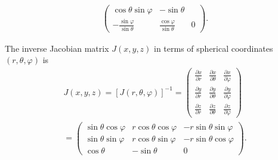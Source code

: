 {\begin{equation}
\begin{split}
\begin{pmatrix}
 \cos \theta \sin \varphi  &
-  \sin \theta    \\
-\frac{ \sin \varphi }{   \sin \theta}&
\frac{ \cos \varphi }{   \sin \theta}&
0
\end{pmatrix}
.
\end{split}
\label{2018-mm-ch-sf-ijbsc}
\end{equation}

The inverse Jacobian matrix
$J(x,y,z)$ in terms of spherical coordinates $(r, \theta , \varphi )$ is
\begin{equation}
\begin{split}
J(x,y,z) = \left[J(r,\theta ,\varphi )\right]^{-1}
=
\begin{pmatrix}
\frac{\partial x}{\partial r} &
\frac{\partial x}{\partial \theta } &
\frac{\partial x}{\partial \varphi } \\
\frac{\partial y}{\partial r} &
\frac{\partial y}{\partial \theta } &
\frac{\partial y}{\partial \varphi } \\
\frac{\partial z}{\partial r} &
\frac{\partial z}{\partial \theta } &
\frac{\partial z}{\partial \varphi }
\end{pmatrix}
\\
=
\begin{pmatrix}
\sin \theta \cos \varphi &  r\cos \theta \cos \varphi &  -r\sin \theta \sin \varphi \\
\sin \theta \sin \varphi &  r\cos \theta \sin \varphi &  -r\sin \theta \cos \varphi \\
\cos \theta & - \sin \theta & 0
\end{pmatrix}
.
\end{split}
\label{2018-mm-ch-sf-ijbscinv}
\end{equation}

}
